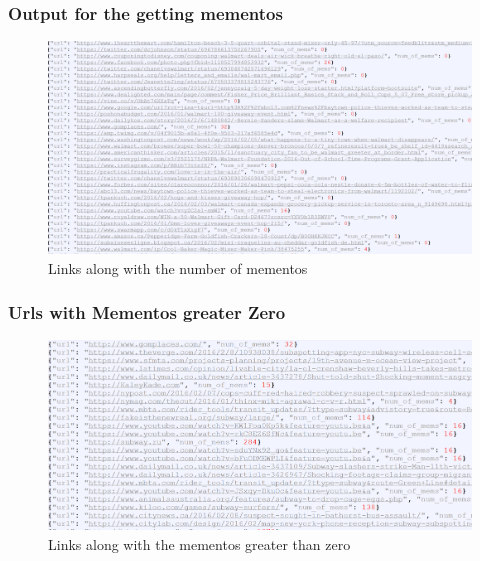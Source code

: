 \subsubsection{Output for the getting mementos}
\begin{figure}[ht]    
    \begin{center}
        \includegraphics[scale=0.37]{output_mem_and_links.png}
        \caption{Links along with the number of mementos}
        \label{Links along with the number of mementos}
    \end{center}
\end{figure}
\newpage
\subsubsection{Urls with Mementos greater Zero}
\begin{figure}[ht]    
    \begin{center}
        \includegraphics[scale=0.37]{mem_great_zero.png}
        \caption{Links along with the mementos greater than zero}
        \label{Links along with the mementos greater than zero}
    \end{center}
\end{figure}
\newpage
